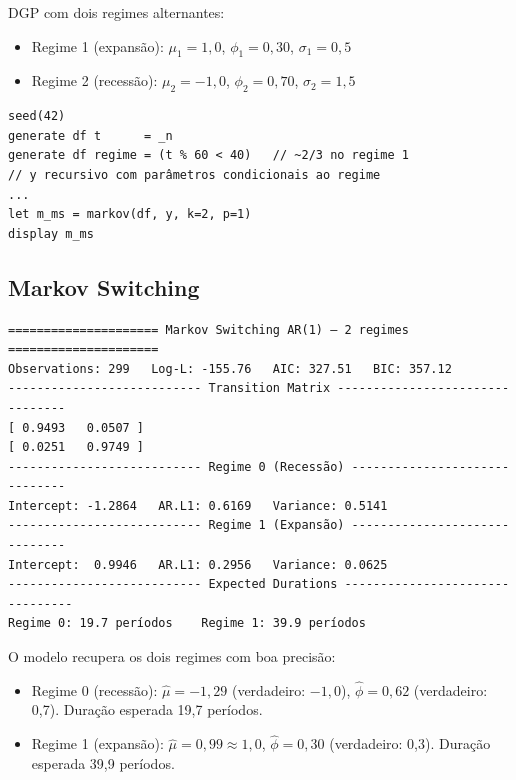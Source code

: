 DGP com dois regimes alternantes:
\begin{itemize}
  \item Regime 1 (expansão): $\mu_1 = 1{,}0$, $\phi_1 = 0{,}30$, $\sigma_1 = 0{,}5$
  \item Regime 2 (recessão): $\mu_2 = -1{,}0$, $\phi_2 = 0{,}70$, $\sigma_2 = 1{,}5$
\end{itemize}

\begin{lstlisting}[caption={DGP Markov Switching AR(1) e estimação}]
seed(42)
generate df t      = _n
generate df regime = (t % 60 < 40)   // ~2/3 no regime 1
// y recursivo com parâmetros condicionais ao regime
...
let m_ms = markov(df, y, k=2, p=1)
display m_ms
\end{lstlisting}

\subsection*{Markov Switching}

\begin{lstlisting}[language={}, basicstyle=\ttfamily\small,
  frame=none, numbers=none, backgroundcolor=\color{codbg},
  xleftmargin=0pt, xrightmargin=0pt, breaklines=false]
===================== Markov Switching AR(1) — 2 regimes =====================
Observations: 299   Log-L: -155.76   AIC: 327.51   BIC: 357.12
--------------------------- Transition Matrix --------------------------------
[ 0.9493   0.0507 ]
[ 0.0251   0.9749 ]
--------------------------- Regime 0 (Recessão) ------------------------------
Intercept: -1.2864   AR.L1: 0.6169   Variance: 0.5141
--------------------------- Regime 1 (Expansão) ------------------------------
Intercept:  0.9946   AR.L1: 0.2956   Variance: 0.0625
--------------------------- Expected Durations --------------------------------
Regime 0: 19.7 períodos    Regime 1: 39.9 períodos
\end{lstlisting}

O modelo recupera os dois regimes com boa precisão:
\begin{itemize}
  \item Regime 0 (recessão): $\hat\mu = -1{,}29$ (verdadeiro: $-1{,}0$),
  $\hat\phi = 0{,}62$ (verdadeiro: 0{,}7). Duração esperada 19{,}7 períodos.
  \item Regime 1 (expansão): $\hat\mu = 0{,}99 \approx 1{,}0$,
  $\hat\phi = 0{,}30$ (verdadeiro: 0{,}3). Duração esperada 39{,}9 períodos.
\end{itemize}

